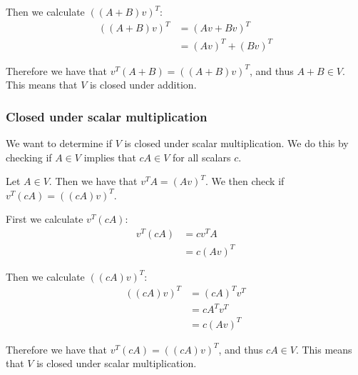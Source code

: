 Then we calculate $((A + B)v)^T$:
\begin{align*}
	((A + B)v)^T & = (Av + Bv)^T     \\
	             & = (Av)^T + (Bv)^T
\end{align*}

Therefore we have that $v^T(A + B) = ((A + B)v)^T$, and thus $A + B \in V$. This means that $V$ is closed under addition.

\subsubsection{Closed under scalar multiplication}
We want to determine if $V$ is closed under scalar multiplication. We do this by checking if $A \in V$ implies that $cA \in V$ for all scalars $c$.

Let $A \in V$. Then we have that $v^TA = (Av)^T$. We then check if $v^T(cA) = ((cA)v)^T$.

First we calculate $v^T(cA)$:
\begin{align*}
	v^T(cA) & = cv^TA   \\
	        & = c(Av)^T
\end{align*}

Then we calculate $((cA)v)^T$:
\begin{align*}
	((cA)v)^T & = (cA)^Tv^T \\
	          & = cA^Tv^T   \\
	          & = c(Av)^T
\end{align*}

Therefore we have that $v^T(cA) = ((cA)v)^T$, and thus $cA \in V$. This means that $V$ is closed under scalar multiplication.

